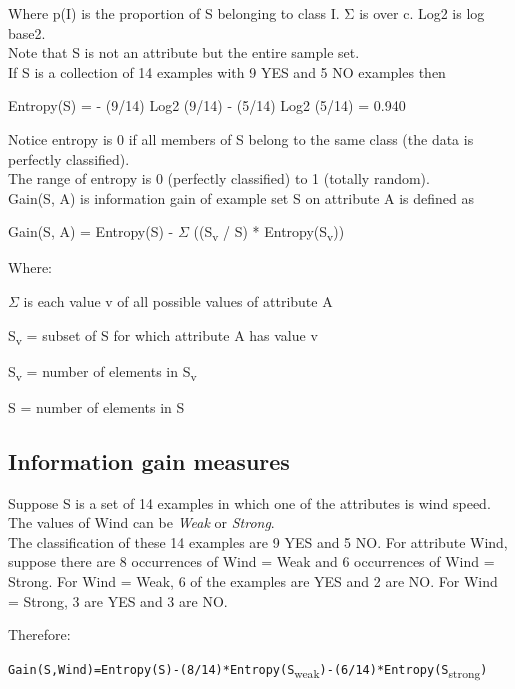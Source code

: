 \documentclass{report}
\newcommand\textstyleTeletype[1]{\texttt{#1}}
\begin{document}
Where p(I) is the proportion of S belonging to class I. Σ is over c. Log2 is 
log base2.\\
Note that S is not an attribute but the entire sample set.\\

If S is a collection of 14 examples with 9 YES and 5 NO examples then\\

{\centering
Entropy(S) = {}- (9/14) Log2 (9/14) {}- (5/14) Log2 (5/14) = 0.940
\par}


Notice entropy is 0 if all members of S belong to the same class (the
data is perfectly classified). \\
The range of entropy is 0 (perfectly classified) to 1 (totally random).\\

Gain(S, A) is information gain of example set S on attribute A is
defined as

{\centering

Gain(S, A) = Entropy(S) {}- ${\Sigma}$
(({\textbar}S\textsubscript{v}{\textbar} / {\textbar}S{\textbar}) *
Entropy(S\textsubscript{v}))
\par}

Where:

${\Sigma}$ is each value v of all possible values of attribute A

S\textsubscript{v} = subset of S for which attribute A has value v

{\textbar}S\textsubscript{v}{\textbar} = number of elements in
S\textsubscript{v}

{\textbar}S{\textbar} = number of elements in S

\subsection{Information gain measures}

Suppose S is a set of 14 examples in which one of the attributes is wind
speed. The values of Wind can be \textit{Weak} or \textit{Strong}. \\
The classification of these 14 examples are 9 YES and 5 NO. For attribute
Wind, suppose there are 8 occurrences of Wind = Weak and 6 occurrences
of Wind = Strong. For Wind = Weak, 6 of the examples are YES and 2 are
NO. For Wind = Strong, 3 are YES and 3 are NO.\\ 
\pagebreak

Therefore:

{\centering
\textstyleTeletype{Gain(S,Wind)=Entropy(S){}-(8/14)*Entropy(S}\textsubscript{weak}\textstyleTeletype{){}-(6/14)*Entropy(S}\textsubscript{strong}\textstyleTeletype{)}
\par}
\end{document}
